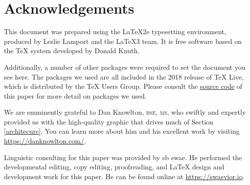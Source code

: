 \section{Acknowledgements}
This document was prepared using the \LaTeX2e typesetting environment, produced by Leslie Lamport and the \LaTeX3 team. It is free software based on the \TeX{} system developed by Donald Knuth.

Additionally, a number of other packages were required to set the document you see here. The packages we used are all included in the 2018 release of \TeX{} Live, which is distributed by the \TeX{} Users Group. Please consult the \href{https://github.com/dura-sh/durachain-whitepaper}{source code} of this paper for more detail on packages we used.

We are emminently grateful to Dan Knowlton, \textsc{bse}, \textsc{ms}, who swiftly and expertly provided us with the high-quality graphic that drives much of Section \ref{architecure}. You can learn more about him and his excellent work by visiting \url{https://danknowlton.com/}.

Linguistic consulting for this paper was provided by sb swae. He performed the developmental editing, copy editing, proofreading, and \LaTeX{} design and development work for this paper. He can be found online at \url{https://swaevior.io}.
